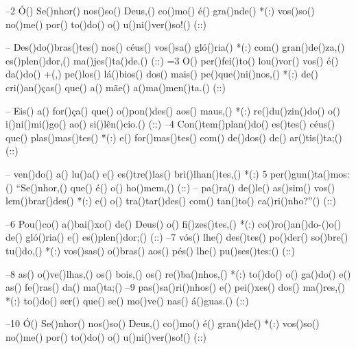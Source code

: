 –2 Ó() Se()nhor() nos()so() Deus,() co()mo() é() gra()nde() *(:)
vos()so() no()me() por() to()do() o() u()ni()ver()so!() (::)

– Des()do()bras()tes() nos() céus() vos()sa() gló()ria() *(:)
com() gran()de()za,() es()plen()dor,() ma()jes()ta()de.() (::)
=3 O() per()fei()to() lou()vor() vos() é() da()do() +(,)
pe()los() lá()bios() dos() mais() pe()que()ni()nos,() *(:)
de() cri()an()ças() que() a() mãe() a()ma()men()ta.() (::)

– Eis() a() for()ça() que() o()pon()des() aos() maus,() *(:)
re()du()zin()do() o() i()ni()mi()go() ao() si()lên()cio.() (::)
–4 Con()tem()plan()do() es()tes() céus() que() plas()mas()tes() *(:)
e() for()mas()tes() com() de()dos() de() ar()tis()ta;() (::)

– ven()do() a() lu()a() e() es()tre()las() bri()lhan()tes,() *(:)
5 per()gun()ta()mos:() ``Se()nhor,() que() é() o() ho()mem,() (::)
– pa()ra() de()le() as()sim() vos() lem()brar()des() *(:)
e() o() tra()tar()des() com() tan()to() ca()ri()nho?''() (::)

–6 Pou()co() a()bai()xo() de() Deus() o() fi()zes()tes,() *(:)
co()ro()an()do-()o() de() gló()ria() e() es()plen()dor;() (::)
–7 vós() lhe() des()tes() po()der() so()bre() tu()do,() *(:)
vos()sas() o()bras() aos() pés() lhe() pu()ses()tes:() (::)

–8 as() o()ve()lhas,() os() bois,() os() re()ba()nhos,() *(:)
to()do() o() ga()do() e() as() fe()ras() da() ma()ta;()
–9 pas()sa()ri()nhos() e() pei()xes() dos() ma()res,() *(:)
to()do() ser() que() se() mo()ve() nas() á()guas.() (::)

–10 Ó() Se()nhor() nos()so() Deus,() co()mo() é() gran()de() *(:)
vos()so() no()me() por() to()do() o() u()ni()ver()so!() (::)